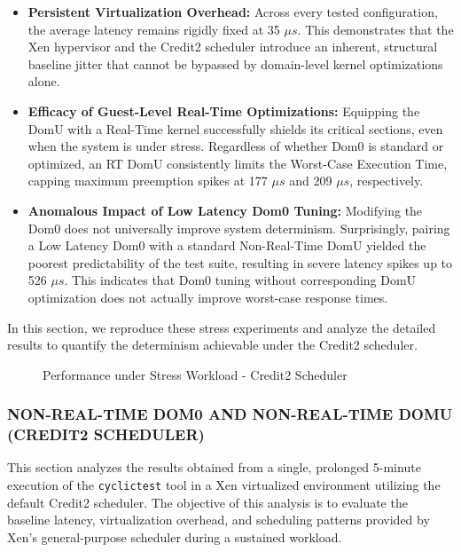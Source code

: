 \begin{itemize}
\item
  \textbf{Persistent Virtualization Overhead:} Across every tested
  configuration, the average latency remains rigidly fixed at 35 $\mu s$.
  This demonstrates that the Xen hypervisor and the Credit2 scheduler
  introduce an inherent, structural baseline jitter that cannot be
  bypassed by domain-level kernel optimizations alone.
\item
  \textbf{Efficacy of Guest-Level Real-Time Optimizations:} Equipping
  the DomU with a Real-Time kernel successfully shields its critical
  sections, even when the system is under stress. Regardless of whether
  Dom0 is standard or optimized, an RT DomU consistently limits the
  Worst-Case Execution Time, capping maximum preemption spikes at 177 $\mu s$
  and 209 $\mu s$, respectively.
\item
  \textbf{Anomalous Impact of Low Latency Dom0 Tuning:} Modifying the
  Dom0 does not universally improve system determinism. Surprisingly,
  pairing a Low Latency Dom0 with a standard Non-Real-Time DomU yielded
  the poorest predictability of the test suite, resulting in severe
  latency spikes up to 526 $\mu s$. This indicates that Dom0 tuning without
  corresponding DomU optimization does not actually improve worst-case
  response times.
\end{itemize}

In this section, we reproduce these stress experiments and analyze the
detailed results to quantify the determinism achievable under the
Credit2 scheduler.

\begin{figure}
\centering

\caption{Performance under Stress Workload - Credit2 Scheduler}
\end{figure}

\subsubsection{NON-REAL-TIME DOM0 AND NON-REAL-TIME DOMU (CREDIT2
SCHEDULER)}\label{non-real-time-dom0-and-non-real-time-domu-credit2-scheduler-1}

This section analyzes the results obtained from a single, prolonged
5-minute execution of the \texttt{cyclictest} tool in a Xen virtualized
environment utilizing the default Credit2 scheduler. The objective of
this analysis is to evaluate the baseline latency, virtualization
overhead, and scheduling patterns provided by Xen's general-purpose
scheduler during a sustained workload.


